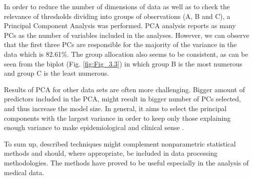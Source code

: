 \documentclass[12pt,a4paper,notitlepage]{report}
\begin{document}
In order to reduce the number of dimensions of data as well as to check the relevance of thresholds dividing into groups of observations (A, B and C), a Principal Component Analysis was performed. PCA analysis reports as many PCs as the number of variables included in the analyses. However, we can observe that the first three PCs are responsible for the majority of the variance in the data which is 82.61\%. 
The group allocation also seems to be consistent, as can be seen from the biplot (Fig. \ref{fig:Fig_3.3}) in which group B is the most numerous and group C is the least numerous.

Results of PCA for other data sets are often more challenging. Bigger amount of predictors included in the PCA, might result in bigger number of PCs selected, and thus increase the model size. In general, it aims to select the principal components with the largest variance in order to keep only those explaining enough variance to make epidemiological and clinical sense \cite{Zhang17}.

To sum up, described techniques might complement  nonparametric statistical methods and should, where appropriate, be included in data processing methodologies. The methods have proved to be useful especially in the analysis of medical data.


\end{document}
